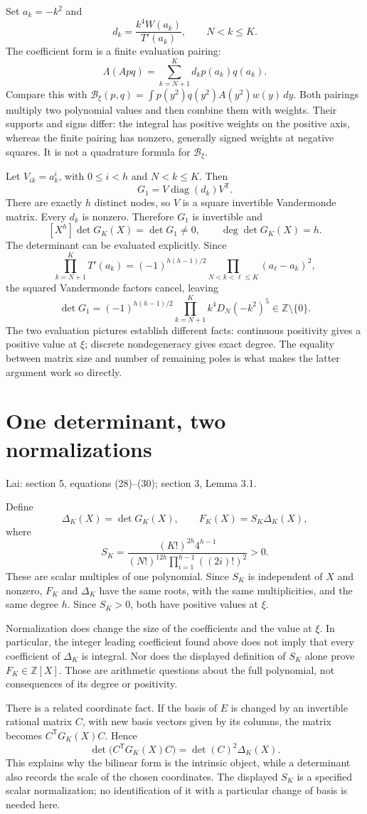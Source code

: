 \documentclass[11pt]{article}
\newcommand{\Z}{\mathbb Z}
\newcommand{\dd}{\,d}
\newcommand{\Bcal}{\mathcal B}
\newcommand{\source}[1]{{\small\color{blue!45!black}Lai: #1.}\par}
\newcommand{\pagetitle}[2]{\section*{#1}\source{#2}}
\begin{document}
Set $a_k=-k^2$ and
\[
 d_k=\frac{k^4W(a_k)}{T'(a_k)},\qquad N<k\leq K.
\]
The coefficient form is a finite evaluation pairing:
\[
 \Lambda(Apq)=\sum_{k=N+1}^K d_kp(a_k)q(a_k).
\]
Compare this with
$\Bcal_\xi(p,q)=\int p(y^2)q(y^2)A(y^2)w(y)\dd y$.
Both pairings multiply two polynomial values and then combine them with
weights. Their supports and signs differ: the integral has positive weights
on the positive axis, whereas the finite pairing has nonzero, generally
signed weights at negative squares. It is not a quadrature formula for
$\Bcal_\xi$.

Let $V_{ik}=a_k^i$, with $0\leq i<h$ and $N<k\leq K$. Then
\[
 G_1=V\operatorname{diag}(d_k)V^{\mathsf T}.
\]
There are exactly $h$ distinct nodes, so $V$ is a square invertible
Vandermonde matrix. Every $d_k$ is nonzero. Therefore $G_1$ is invertible and
\[
 [X^h]\det G_K(X)=\det G_1\ne0,\qquad \deg\det G_K(X)=h.
\]
The determinant can be evaluated explicitly. Since
\[
 \prod_{k=N+1}^K T'(a_k)
 =(-1)^{h(h-1)/2}\prod_{N<k<\ell\leq K}(a_\ell-a_k)^2,
\]
the squared Vandermonde factors cancel, leaving
\[
 \boxed{\det G_1=(-1)^{h(h-1)/2}
       \prod_{k=N+1}^K k^4D_N(-k^2)^5\in\Z\setminus\{0\}.}
\]
The two evaluation pictures establish different facts: continuous positivity
gives a positive value at $\xi$; discrete nondegeneracy gives exact degree.
The equality between matrix size and number of remaining poles is what
makes the latter argument work so directly.

\newpage
\pagetitle{One determinant, two normalizations}
{section 5, equations (28)--(30); section 3, Lemma 3.1}
Define
\[
 \Delta_K(X)=\det G_K(X),\qquad F_K(X)=S_K\Delta_K(X),
\]
where
\[
 S_K=\frac{(K!)^{2h}4^{h-1}}
 {(N!)^{12h}\displaystyle\prod_{i=1}^{h-1}((2i)!)^2}>0.
\]
These are scalar multiples of one polynomial. Since $S_K$ is independent
of $X$ and nonzero, $F_K$ and $\Delta_K$ have the same roots, with the
same multiplicities, and the same degree $h$. Since $S_K>0$, both have
positive values at $\xi$.

Normalization does change the size of the coefficients and the value at
$\xi$. In particular, the integer leading coefficient found above does not
imply that every coefficient of $\Delta_K$ is integral. Nor does the displayed
definition of $S_K$ alone prove $F_K\in\Z[X]$. Those are arithmetic questions
about the full polynomial, not consequences of its degree or positivity.

There is a related coordinate fact. If the basis of $E$ is changed by an
invertible rational matrix $C$, with new basis vectors given by its columns,
the matrix becomes $C^{\mathsf T}G_K(X)C$. Hence
\[
 \det\bigl(C^{\mathsf T}G_K(X)C\bigr)
 =\det(C)^2\Delta_K(X).
\]
This explains why the bilinear form is the intrinsic object, while a
determinant also records the scale of the chosen coordinates. The displayed
$S_K$ is a specified scalar normalization; no identification of it with a
particular change of basis is needed here.
\end{document}
